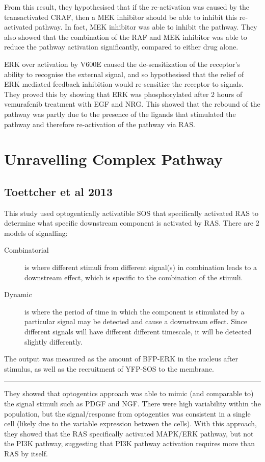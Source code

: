 \documentclass[a4paper,12pt]{article}
\begin{document}
From this result, they hypothesised that if the re-activation was caused by the transactivated CRAF, then a MEK inhibitor should be able to inhibit this re-activated pathway.
In fact, MEK inhibitor was able to inhibit the pathway.
They also showed that the combination of the RAF and MEK inhibitor was able to reduce the pathway activation significantly, compared to either drug alone.

ERK over activation by V600E caused the de-sensitization of the receptor's ability to recognise the external signal, and so hypothesised that the relief of ERK mediated feedback inhibition would re-sensitize the receptor to signals.
They proved this by showing that ERK was phosphorylated after 2 hours of vemurafenib treatment with EGF and NRG.
This showed that the rebound of the pathway was partly due to the presence of the ligands that stimulated the pathway and therefore re-activation of the pathway via RAS.

\section*{Unravelling Complex Pathway}

\subsection*{\normalsize{Toettcher et al 2013}}

This study used optogentically activatible SOS that specifically activated RAS to determine what specific downstream component is activated by RAS.
There are 2 models of signalling:
\begin{description}
\item[Combinatorial] is where different stimuli from different signal(s) in combination leads to a downstream effect, which is specific to the combination of the stimuli.
\item[Dynamic] is where the period of time in which the component is stimulated by a particular signal may be detected and cause a downstream effect.
Since different signals will have different different timescale, it will be detected slightly differently.
\end{description}
The output was measured as the amount of BFP-ERK in the nucleus after stimulus, as well as the recruitment of YFP-SOS to the membrane.

\noindent\rule{\textwidth}{0.4pt}

They showed that optogentics approach was able to mimic (and comparable to) the signal stimuli such as PDGF and NGF.
There were high variability within the population, but the signal/response from optogentics was consistent in a single cell (likely due to the variable expression between the cells).
With this approach, they showed that the RAS specifically activated MAPK/ERK pathway, but not the PI3K pathway, suggesting that PI3K pathway activation requires more than RAS by itself.
\end{document}
